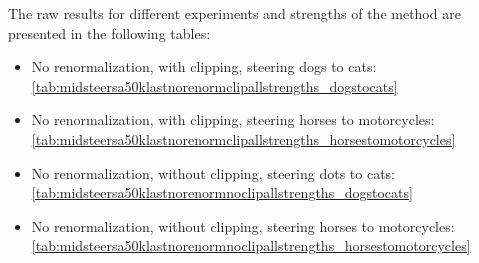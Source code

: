 The raw results for different experiments and strengths of the method are presented in the following tables:
\begin{itemize}
    \item No renormalization, with clipping, steering dogs to cats: \ref{tab:midsteersa50klastnorenormclipallstrengths_dogstocats}

    \item No renormalization, with clipping, steering horses to motorcycles: \ref{tab:midsteersa50klastnorenormclipallstrengths_horsestomotorcycles}

    \item No renormalization, without clipping, steering dots to cats: \ref{tab:midsteersa50klastnorenormnoclipallstrengths_dogstocats}

    \item No renormalization, without clipping, steering horses to motorcycles: \ref{tab:midsteersa50klastnorenormnoclipallstrengths_horsestomotorcycles}
\end{itemize}






